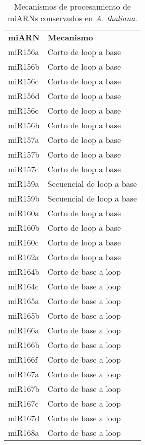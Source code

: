 \begin{table}[]
\tiny
\centering
\caption{Mecanismos de procesamiento de miARNs conservados en \textit{A. thaliana}.}
\label{table:mecanismos}
\begin{tabular}{ll}
\textbf{miARN} & \textbf{Mecanismo}        \\
miR156a        & Corto de loop a base      \\
miR156b        & Corto de loop a base      \\
miR156c        & Corto de loop a base      \\
miR156d        & Corto de loop a base      \\
miR156e        & Corto de loop a base      \\
miR156h        & Corto de loop a base      \\
miR157a        & Corto de loop a base      \\
miR157b        & Corto de loop a base      \\
miR157c        & Corto de loop a base      \\
miR159a        & Secuencial de loop a base \\
miR159b        & Secuencial de loop a base \\
miR160a        & Corto de loop a base      \\
miR160b        & Corto de loop a base      \\
miR160c        & Corto de loop a base      \\
miR162a        & Corto de loop a base      \\
miR164b        & Corto de base a loop      \\
miR164c        & Corto de base a loop      \\
miR165a        & Corto de base a loop      \\
miR165b        & Corto de base a loop      \\
miR166a        & Corto de base a loop      \\
miR166b        & Corto de base a loop      \\
miR166f        & Corto de base a loop      \\
miR167a        & Corto de base a loop      \\
miR167b        & Corto de base a loop      \\
miR167c        & Corto de base a loop      \\
miR167d        & Corto de base a loop      \\
miR168a        & Corto de base a loop      \\

\end{tabular}
\end{table}
